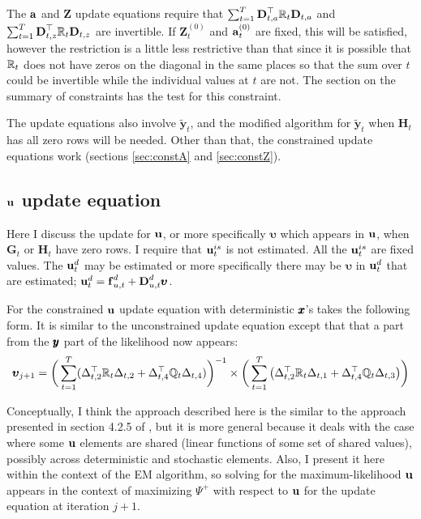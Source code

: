 \documentclass[]{article}
\def\uupsilon{\pmb{\upsilon}}
\def\ZZ{\mbox{$\mathbf Z$}}	\def\zz{\mbox{$\mathbf z$}}
\def\DD{\mbox{$\mathbf D$}}	\def\dd{\mbox{$\mathbf d$}}
\def\GG{\mbox{$\mathbf G$}}	\def\gg{\mbox{$\mathbf g$}}
\def\HH{\mbox{$\mathbf H$}}	\def\hh{\mbox{$\mathbf h$}}
\def\hatyt{\widetilde{\mbox{$\mathbf y$}}_t}
\begin{document}
The $\aa$ and $\ZZ$ update equations require that $\sum_{t=1}^T \DD_{t,a}^\top\Rm_t\DD_{t,a}$ and $\sum_{t=1}^T \DD_{t,z}^\top\Rm_t\DD_{t,z}$ are invertible.  If $\ZZ_t^{(0)}$ and $\aa_t^{(0)}$ are fixed, this will be satisfied, however the restriction is a little less restrictive than that since it is possible that $\Rm_t$ does not have zeros on the diagonal in the same places so that the sum over $t$ could be invertible while the individual values at $t$ are not.  The section on the summary of constraints has the test for this constraint.

The  update equations also
involve $\hatyt$, and the modified algorithm for $\hatyt$ when $\HH_t$ has all zero rows will be needed.  Other than that, the constrained update equations work (sections \ref{sec:constA} and \ref{sec:constZ}).  

\subsection{$\uu$ update equation}

Here I discuss the update for $\uu$, or more specifically $\uupsilon$ which appears in $\uu$, when $\GG_t$ or $\HH_t$ have zero rows.  I require that $\uu^{is}_t$ is not estimated.  All the $\uu^{is}_t$ are fixed values.  The $\uu_t^d$ may be estimated or more specifically there may be $\uupsilon$ in $\uu_t^d$ that are estimated;     $\uu_t^d = \ff_{u,t}^d+\DD_{u,t}^d\uupsilon$.


For the constrained $\uu$ update equation with deterministic $\xx$'s takes the following form.  It is similar to the unconstrained update equation except that that a part from the $\yy$ part of the likelihood now appears:
\begin{equation}
\begin{split}\label{eq:u.update.degen.2}
\pmb{\upsilon}_{j+1} = \bigg(\sum_{t=1}^T(\Delta_{t,2}^\top\Rm_t\Delta_{t,2} + \Delta_{t,4}^\top\Qm_t\Delta_{t,4})\bigg)^{-1} \times
 \bigg( \sum_{t=1}^T \big( \Delta_{t,2}^\top\Rm_t\Delta_{t,1} + \Delta_{t,4}^\top\Qm_t\Delta_{t,3} \big)  \bigg)\\
\end{split}
\end{equation}

Conceptually, I think the approach described here is the similar to the approach presented in section 4.2.5 of \citep{Harvey1989}, but it is more general because it deals with the case where some $\uu$ elements are shared (linear functions of some set of shared values), possibly across deterministic and stochastic elements.  Also, I present it here within the context of the EM algorithm, so solving for the maximum-likelihood $\uu$ appears in the context of maximizing $\Psi^+$ with respect to $\uu$ for the update equation at iteration $j+1$.
\end{document}
